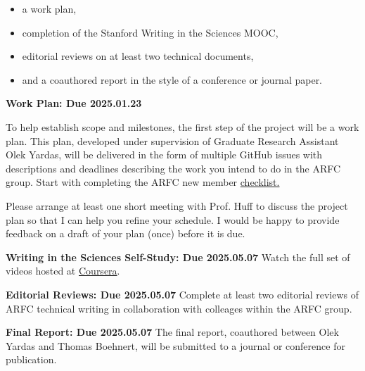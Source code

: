 \documentclass[12pts, answers]{exam}
\newcommand{\duedate}{2025.05.07}
\begin{document}
\begin{itemize}
        \item a work plan,
        \item completion of the Stanford Writing in the Sciences MOOC,
        \item editorial reviews on at least two technical documents,
        \item and a coauthored report in the style of a conference or journal paper.
\end{itemize}

\begin{questions}
\addpoints
\question[10] \textbf{Work Plan: Due 2025.01.23}

To help establish scope and milestones, the first step of the project will be 
        a 
        work plan. This plan, developed under supervision of Graduate Research 
        Assistant Olek Yardas, will be delivered in the form of multiple GitHub 
        issues with descriptions and deadlines describing the work you intend 
        to do in the ARFC group. Start with completing the ARFC new member 
        \href{https://github.com/orgs/arfc/projects/37/views/1}{checklist.}

Please arrange at least one short meeting with Prof. Huff to discuss the project plan
so that I can help you refine your schedule. I would be happy to provide feedback 
on a draft of your plan (once) before it is due.

\question[20] \textbf{Writing in the Sciences Self-Study: Due \duedate}
        Watch the full set of videos hosted at
        \href{https://www.coursera.org/learn/sciwrite/}{Coursera}.

\question[20] \textbf{Editorial Reviews: Due \duedate}
Complete at least two editorial reviews of ARFC technical writing in 
        collaboration with colleages within the ARFC group. 

\question[60] \textbf{Final Report: Due \duedate}
The final report, coauthored between Olek Yardas and Thomas Boehnert, will be
submitted to a journal or conference for publication.

\end{questions}


%
%
\end{document}
